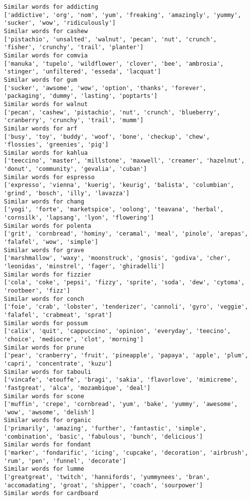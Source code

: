 \documentclass[11pt]{article}
\begin{document}
\begin{Verbatim}[commandchars=\\\{\}]
Similar words for addicting
['addictive', 'org', 'nom', 'yum', 'freaking', 'amazingly', 'yummy', 'sucker', 'wow', 'ridiculously']
Similar words for cashew
['pistachio', 'unsalted', 'walnut', 'pecan', 'nut', 'crunch', 'fisher', 'crunchy', 'trail', 'planter']
Similar words for comvia
['manuka', 'tupelo', 'wildflower', 'clover', 'bee', 'ambrosia', 'stinger', 'unfiltered', 'esseda', 'lacquat']
Similar words for gum
['sucker', 'awsome', 'wow', 'option', 'thanks', 'forever', 'packaging', 'dummy', 'lasting', 'poptarts']
Similar words for walnut
['pecan', 'cashew', 'pistachio', 'nut', 'crunch', 'blueberry', 'cranberry', 'crunchy', 'trail', 'mumm']
Similar words for arf
['busy', 'toy', 'buddy', 'woof', 'bone', 'checkup', 'chew', 'flossies', 'greenies', 'pig']
Similar words for kahlua
['teeccino', 'master', 'millstone', 'maxwell', 'creamer', 'hazelnut', 'donut', 'community', 'gevalia', 'cuban']
Similar words for espresso
['expresso', 'vienna', 'kuerig', 'keurig', 'balista', 'columbian', 'grind', 'bosch', 'illy', 'lavazza']
Similar words for chang
['yogi', 'forte', 'marketspice', 'oolong', 'teavana', 'herbal', 'cornsilk', 'lapsang', 'lyon', 'flowering']
Similar words for polenta
['grit', 'cornbread', 'hominy', 'ceramal', 'meal', 'pinole', 'arepas', 'falafel', 'wow', 'simple']
Similar words for grave
['marshmallow', 'waxy', 'moonstruck', 'gnosis', 'godiva', 'cher', 'leonidas', 'minstrel', 'fager', 'ghiradelli']
Similar words for fizzier
['cola', 'coke', 'pepsi', 'fizzy', 'sprite', 'soda', 'dew', 'cytoma', 'rootbeer', 'fizz']
Similar words for conch
['foie', 'crab', 'lobster', 'tenderizer', 'cannoli', 'gyro', 'veggie', 'falafel', 'crabmeat', 'sprat']
Similar words for possum
['calix', 'quit', 'cappuccino', 'opinion', 'everyday', 'teecino', 'choice', 'mediocre', 'clot', 'morning']
Similar words for prune
['pear', 'cranberry', 'fruit', 'pineapple', 'papaya', 'apple', 'plum', 'capri', 'concentrate', 'kuzu']
Similar words for tabouli
['vincafe', 'etouffe', 'bragi', 'sakia', 'flavorlove', 'mimicreme', 'fastgreat', 'alca', 'mozambique', 'deal']
Similar words for scone
['muffin', 'crepe', 'cornbread', 'yum', 'bake', 'yummy', 'awesome', 'wow', 'awsome', 'delish']
Similar words for organic
['primarily', 'amazing', 'further', 'fantastic', 'simple', 'combination', 'basic', 'fabulous', 'bunch', 'delicious']
Similar words for fondant
['marker', 'fondarific', 'icing', 'cupcake', 'decoration', 'airbrush', 'rum', 'pen', 'funnel', 'decorate']
Similar words for lumme
['greatgreat', 'twitch', 'hannifords', 'yummynees', 'bran', 'accomadating', 'groat', 'shipper', 'coach', 'sourpower']
Similar words for cardboard

\end{Verbatim}
\end{document}
